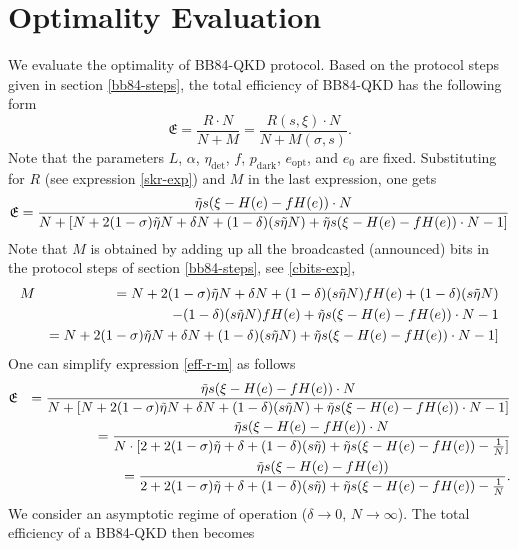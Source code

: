 \documentclass[journal,onecolumn]{IEEEtran}
\theoremstyle{thmstyleone}%
\theoremstyle{thmstyletwo}%
\theoremstyle{thmstylethree}%
\begin{document}
	\section{Optimality Evaluation}\label{opt-eval}
	We evaluate the optimality of BB84-QKD protocol. Based on the protocol steps given in section \ref{bb84-steps}, the total efficiency of BB84-QKD has the following form
	\begin{equation}
		\mathfrak{E} = \frac{R\cdot N}{N + M} = \frac{R(s,\xi)\cdot N}{N + M(\sigma,s)}.
	\end{equation}
	Note that the parameters $L$, $\alpha$, $\eta_{\text{det}}$, $f$, $p_{\text{dark}}$, $e_{\text{opt}}$, and $e_0$ are fixed. Substituting for $R$ (see expression \eqref{skr-exp}) and $M$ in the last expression, one gets
	\begin{eqnarray}\label{eff-r-m}
		\mathfrak{E} = \frac{\Tilde{\eta}s(\xi-H(e)-fH(e))\cdot N}{N + [N+2(1-\sigma)\Tilde{\eta}N + \delta N + (1-\delta)(s\Tilde{\eta}N) + \Tilde{\eta}s(\xi-H(e)-fH(e))\cdot N - 1]}
	\end{eqnarray}
	Note that $M$ is obtained by adding up all the broadcasted (announced) bits in the protocol steps of section \ref{bb84-steps}, see \eqref{cbits-exp},
	\begin{eqnarray}
		M &&= N+2(1-\sigma)\Tilde{\eta}N + \delta N + (1-\delta)(s\Tilde{\eta}N)fH(e) + (1-\delta)(s\Tilde{\eta}N)  \nonumber \\
		&& - (1-\delta)(s\Tilde{\eta}N)fH(e) + \Tilde{\eta}s(\xi-H(e)-fH(e))\cdot N - 1 \nonumber \\
		&&= N+2(1-\sigma)\Tilde{\eta}N + \delta N + (1-\delta)(s\Tilde{\eta}N) + \Tilde{\eta}s(\xi-H(e)-fH(e))\cdot N - 1]
	\end{eqnarray}
	One can simplify expression \eqref{eff-r-m} as follows
	\begin{eqnarray}
		\mathfrak{E} &&= \frac{\Tilde{\eta}s(\xi-H(e)-fH(e))\cdot N}{N + [N+2(1-\sigma)\Tilde{\eta}N + \delta N + (1-\delta)(s\Tilde{\eta}N) + \Tilde{\eta}s(\xi-H(e)-fH(e))\cdot N - 1]} \nonumber \\
		&&= \frac{\Tilde{\eta}s(\xi-H(e)-fH(e))\cdot N}{N\cdot[2+2(1-\sigma)\Tilde{\eta} + \delta + (1-\delta)(s\Tilde{\eta}) + \Tilde{\eta}s(\xi-H(e)-fH(e)) - \frac{1}{N}]} \nonumber \\
		&&= \frac{\Tilde{\eta}s(\xi-H(e)-fH(e))}{2+2(1-\sigma)\Tilde{\eta} + \delta + (1-\delta)(s\Tilde{\eta}) + \Tilde{\eta}s(\xi-H(e)-fH(e)) - \frac{1}{N}}.
	\end{eqnarray}
	We consider an asymptotic regime of operation ($\delta\rightarrow0$, $N\rightarrow\infty$). The total efficiency of a BB84-QKD then becomes
\end{document}
